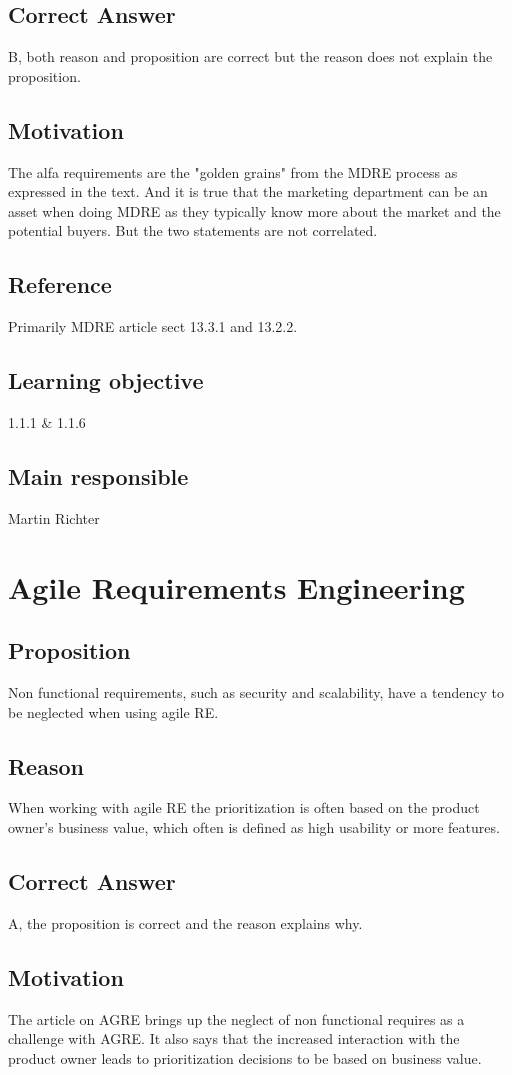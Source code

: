 \documentclass[a4paper]{article}
\begin{document}
\subsection*{Correct Answer}
B, both reason and proposition are correct but the reason does not explain the proposition.
\subsection*{Motivation}
The alfa requirements are the "golden grains" from the MDRE process as expressed in the text. And it is true that the marketing department can be an asset when doing MDRE as they typically know more about the market and the potential buyers. But the two statements are not correlated.
\subsection*{Reference}
Primarily MDRE article sect 13.3.1 and 13.2.2.
\subsection*{Learning objective}
1.1.1 \& 1.1.6
\subsection*{Main responsible}
Martin Richter

\section{Agile Requirements Engineering}
\subsection*{Proposition}
Non functional requirements, such as security and scalability, have a tendency to be neglected when using agile RE. 
\subsection*{Reason}
When working with agile RE the prioritization is often based on the product owner's business value, which often is defined as high usability or more features.
\subsection*{Correct Answer}
A, the proposition is correct and the reason explains why.
\subsection*{Motivation}
The article on AGRE brings up the neglect of non functional requires as a challenge with AGRE. It also says that the increased interaction with the product owner leads to prioritization decisions to be based on business value.
\end{document}
